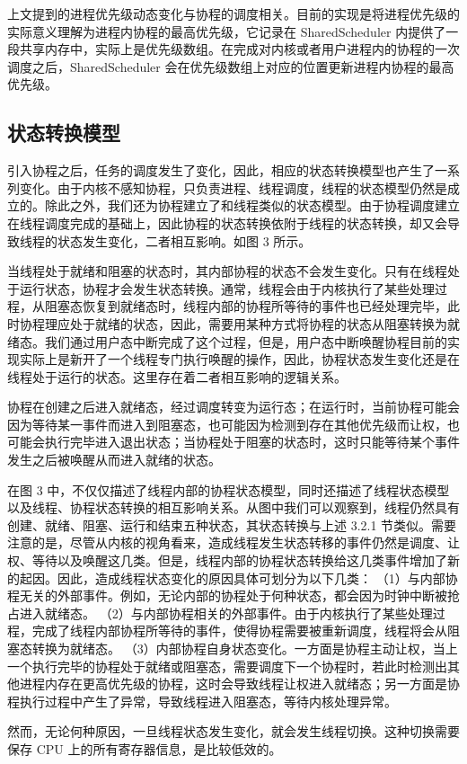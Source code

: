 上文提到的进程优先级动态变化与协程的调度相关。目前的实现是将进程优先级的实际意义理解为进程内协程的最高优先级，它记录在 SharedScheduler 内提供了一段共享内存中，实际上是优先级数组。在完成对内核或者用户进程内的协程的一次调度之后，SharedScheduler 会在优先级数组上对应的位置更新进程内协程的最高优先级。

\subsection{状态转换模型}

引入协程之后，任务的调度发生了变化，因此，相应的状态转换模型也产生了一系列变化。由于内核不感知协程，只负责进程、线程调度，线程的状态模型仍然是成立的。除此之外，我们还为协程建立了和线程类似的状态模型。由于协程调度建立在线程调度完成的基础上，因此协程的状态转换依附于线程的状态转换，却又会导致线程的状态发生变化，二者相互影响。如图 3 所示。


当线程处于就绪和阻塞的状态时，其内部协程的状态不会发生变化。只有在线程处于运行状态，协程才会发生状态转换。通常，线程会由于内核执行了某些处理过程，从阻塞态恢复到就绪态时，线程内部的协程所等待的事件也已经处理完毕，此时协程理应处于就绪的状态，因此，需要用某种方式将协程的状态从阻塞转换为就绪态。我们通过用户态中断完成了这个过程，但是，用户态中断唤醒协程目前的实现实际上是新开了一个线程专门执行唤醒的操作，因此，协程状态发生变化还是在线程处于运行的状态。这里存在着二者相互影响的逻辑关系。

协程在创建之后进入就绪态，经过调度转变为运行态；在运行时，当前协程可能会因为等待某一事件而进入到阻塞态，也可能因为检测到存在其他优先级而让权，也可能会执行完毕进入退出状态；当协程处于阻塞的状态时，这时只能等待某个事件发生之后被唤醒从而进入就绪的状态。


在图 3 中，不仅仅描述了线程内部的协程状态模型，同时还描述了线程状态模型以及线程、协程状态转换的相互影响关系。从图中我们可以观察到，线程仍然具有创建、就绪、阻塞、运行和结束五种状态，其状态转换与上述 3.2.1 节类似。需要注意的是，尽管从内核的视角看来，造成线程发生状态转移的事件仍然是调度、让权、等待以及唤醒这几类。但是，线程内部的协程状态转换给这几类事件增加了新的起因。因此，造成线程状态变化的原因具体可划分为以下几类：
（1）与内部协程无关的外部事件。例如，无论内部的协程处于何种状态，都会因为时钟中断被抢占进入就绪态。
（2）与内部协程相关的外部事件。由于内核执行了某些处理过程，完成了线程内部协程所等待的事件，使得协程需要被重新调度，线程将会从阻塞态转换为就绪态。
（3）内部协程自身状态变化。一方面是协程主动让权，当上一个执行完毕的协程处于就绪或阻塞态，需要调度下一个协程时，若此时检测出其他进程内存在更高优先级的协程，这时会导致线程让权进入就绪态；另一方面是协程执行过程中产生了异常，导致线程进入阻塞态，等待内核处理异常。

然而，无论何种原因，一旦线程状态发生变化，就会发生线程切换。这种切换需要保存 CPU 上的所有寄存器信息，是比较低效的。
